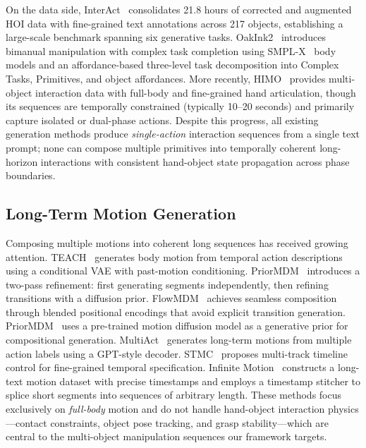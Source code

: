 \documentclass[sigconf, screen, review, anonymous]{acmart}
\begin{document}
On the data side, InterAct~\cite{xu2025interact} consolidates 21.8 hours of corrected and augmented HOI data with fine-grained text annotations across 217 objects, establishing a large-scale benchmark spanning six generative tasks.
OakInk2~\cite{zhan2024oakink2} introduces bimanual manipulation with complex task completion using SMPL-X~\cite{pavlakos2019expressive} body models and an affordance-based three-level task decomposition into Complex Tasks, Primitives, and object affordances.
More recently, HIMO~\cite{himo2024} provides multi-object interaction data with full-body
and fine-grained hand articulation, though its sequences are temporally constrained
(typically 10--20 seconds) and primarily capture isolated or dual-phase actions.
Despite this progress, all existing generation methods produce \emph{single-action} interaction sequences from a single text prompt; none can compose multiple primitives into temporally coherent long-horizon interactions with consistent hand-object state propagation across phase boundaries.

\subsection{Long-Term Motion Generation}
Composing multiple motions into coherent long sequences has received growing attention.
TEACH~\cite{athanasiou2022teach} generates body motion from temporal action descriptions using a conditional VAE with past-motion conditioning.
PriorMDM~\cite{shafir2024priormdm} introduces a two-pass refinement: first generating segments independently, then refining transitions with a diffusion prior.
FlowMDM~\cite{barquero2024seamless} achieves seamless composition through blended positional encodings that avoid explicit transition generation.
PriorMDM~\cite{shafir2024priormdm} uses a pre-trained motion diffusion model as a generative prior for compositional generation.
MultiAct~\cite{lee2023multiact} generates long-term motions from multiple action labels using a GPT-style decoder.
STMC~\cite{petrovich2024multi} proposes multi-track timeline control for fine-grained temporal specification.
Infinite Motion~\cite{li2024infinite} constructs a long-text motion dataset with precise timestamps and employs a timestamp stitcher to splice short segments into sequences of arbitrary length.
These methods focus exclusively on \emph{full-body} motion and do not handle hand-object interaction physics---contact constraints, object pose tracking, and grasp stability---which are central to the multi-object manipulation sequences our framework targets.
\end{document}
